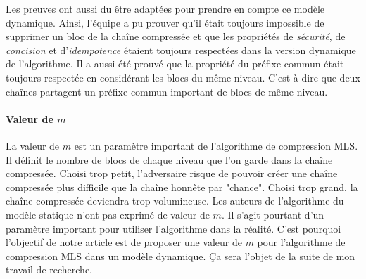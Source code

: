     Les preuves ont aussi du être adaptées pour prendre en compte ce modèle
    dynamique. Ainsi, l'équipe a pu prouver qu'il était toujours impossible de
    supprimer un bloc de la chaîne compressée et que les propriétés de
    \textit{sécurité}, de \textit{concision} et d'\textit{idempotence} étaient
    toujours respectées dans la version dynamique de l'algorithme. Il a aussi
    été prouvé que la propriété du préfixe commun était toujours respectée en
    considérant les blocs du même niveau. C'est à dire que deux chaînes
    partagent un préfixe commun important de blocs de même niveau.

    \paragraph{Valeur de $m$} La valeur de $m$ est un paramètre important de
    l'algorithme de compression MLS. Il définit le nombre de blocs de chaque
    niveau que l'on garde dans la chaîne compressée. Choisi trop petit,
    l'adversaire risque de pouvoir créer une chaîne compressée plus difficile
    que la chaîne honnête par "chance". Choisi trop grand, la chaîne compressée
    deviendra trop volumineuse. Les auteurs de l'algorithme du modèle statique
    n'ont pas exprimé de valeur de $m$. Il s'agit pourtant d'un paramètre
    important pour utiliser l'algorithme dans la réalité. C'est pourquoi
    l'objectif de notre article est de proposer une valeur de $m$ pour
    l'algorithme de compression MLS dans un modèle dynamique. Ça sera l'objet de
    la suite de mon travail de recherche.
